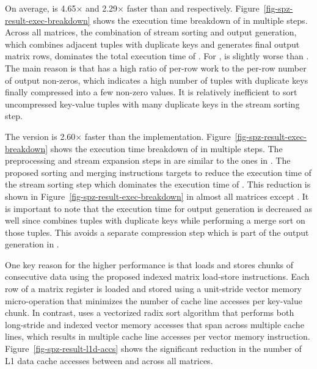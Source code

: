 On average,  is 4.65$\times$ and 2.29$\times$ faster than
 and  respectively.
Figure~\ref{fig-spz-result-exec-breakdown} shows the execution time breakdown
of  in multiple steps.
Across all matrices, the combination of stream sorting and output generation,
which combines adjacent tuples with duplicate keys and generates final output
matrix rows, dominates the total execution time of .
For ,  is slightly worse than .
The main reason is that  has a high ratio of per-row work to the
per-row number of output non-zeros, which indicates a high number of tuples
with duplicate keys finally compressed into a few non-zero values.
It is relatively inefficient to sort uncompressed key-value tuples with many
duplicate keys in the stream sorting step.

The  version is 2.60$\times$ faster than the 
implementation.
Figure~\ref{fig-spz-result-exec-breakdown} shows the execution time breakdown
of  in multiple steps.
The preprocessing and stream expansion steps in  are similar to
the ones in .
The proposed sorting and merging instructions targets to reduce the execution
time of the stream sorting step which dominates the execution time of
.
This reduction is shown in Figure~\ref{fig-spz-result-exec-breakdown} in almost
all matrices except .
It is important to note that the execution time for output generation is
decreased as well since  combines tuples with duplicate keys
while performing a merge sort on those tuples.
This avoids a separate compression step which is part of the output generation
in .

One key reason for the higher performance is that  loads and stores
chunks of consecutive data using the proposed indexed matrix load-store
instructions.
Each row of a matrix register is loaded and stored using a unit-stride vector
memory micro-operation that minimizes the number of cache line accesses per
key-value chunk.
In contrast,  uses a vectorized radix sort algorithm that
performs both long-stride and indexed vector memory accesses that span across
multiple cache lines, which results in multiple cache line accesses per vector
memory instruction.
Figure~\ref{fig-spz-result-l1d-accs} shows the significant reduction in the
number of L1 data cache accesses between  and 
across all matrices.

